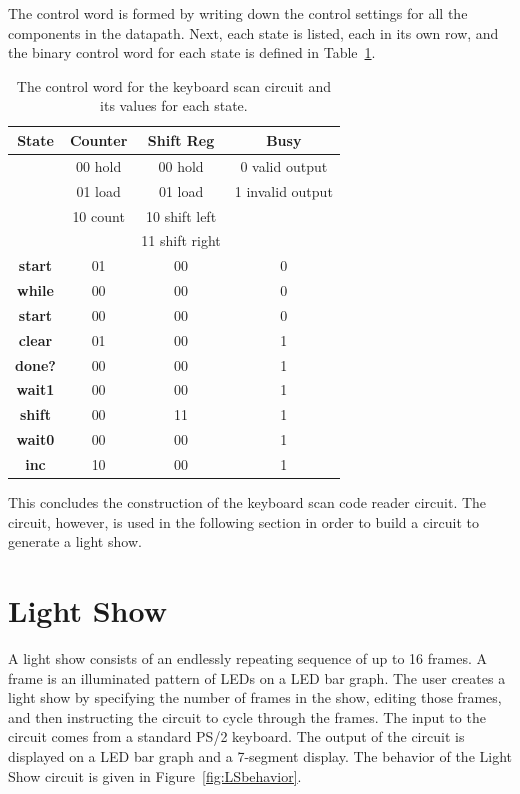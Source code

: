 The control word is formed by writing down the control settings for 
all the components in the datapath.  Next, each state is listed, each 
in its own row, and the binary control word for each state is defined
in Table~\ref{table:kscan}.

\begin{table}
\begin{tabular}{c||c|c|c}  
{\bf State }  & Counter	& Shift Reg	&  Busy  		\\ \hline
        & 00 hold	& 00 hold	& 0 valid output	\\ \hline
        & 01 load	& 01 load	& 1 invalid output	\\ \hline
        & 10 count	& 10 shift left	& 			\\ \hline
        &      		& 11 shift right&			\\ \hline \hline
{\bf start }	&	01	&	00	&	0	\\ \hline
{\bf while }	&	00	&	00	&	0	\\ \hline
{\bf start }	&	00	&	00	&	0	\\ \hline
{\bf clear }	&	01	&	00	&	1	\\ \hline
{\bf done? }	&	00	&	00	&	1	\\ \hline
{\bf wait1 }	&	00	&	00	&	1	\\ \hline
{\bf shift }	&	00	&	11	&	1	\\ \hline
{\bf wait0 }	&	00	&	00	&	1	\\ \hline
{\bf inc }	&	10	&	00	&	1	\\ 
\end{tabular}
\caption{The control word for the keyboard scan circuit and its values for each state.}
\label{table:kscan}
\end{table}

This concludes the construction of the keyboard scan code reader circuit.
The circuit, however, is used in the following section in order to build a
circuit to generate a light show.


\pagebreak
\section{Light Show}

A light show consists of an endlessly repeating sequence of up to 16 frames. 
A frame is an illuminated pattern of LEDs on a LED bar graph. The user 
creates a light show by specifying the number of frames in the show, editing 
those frames, and then instructing the circuit to cycle through the frames. 
The input to the circuit comes from a standard PS/2 keyboard. The output of 
the circuit is displayed on a LED bar graph and a 7-segment display. The 
behavior of the Light Show circuit is given in Figure~\ref{fig:LSbehavior}.
 
